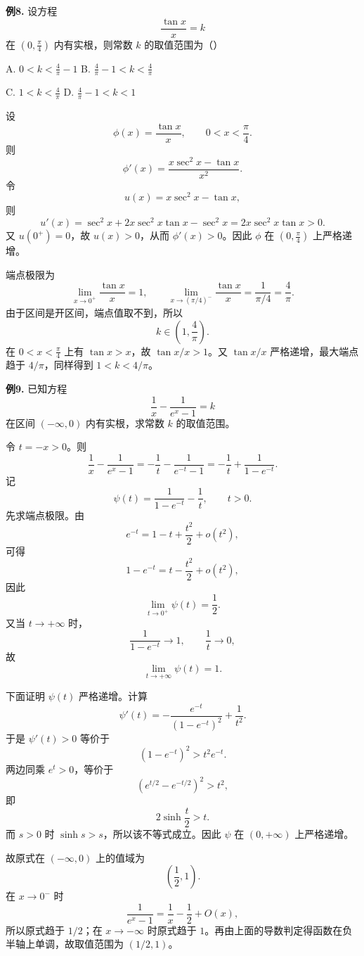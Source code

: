 \begin{problemblock}
\textbf{例8.} 设方程
\[
\frac{\tan x}{x}=k
\]
在 \(\left(0,\frac{\pi}{4}\right)\) 内有实根，则常数 \(k\) 的取值范围为（\quad）

A. \(0<k<\frac4\pi-1\) \qquad
B. \(\frac4\pi-1<k<\frac4\pi\)

C. \(1<k<\frac4\pi\) \qquad
D. \(\frac4\pi-1<k<1\)
\end{problemblock}
\begin{solutionblock}
设
\[
\phi(x)=\frac{\tan x}{x},\qquad 0<x<\frac{\pi}{4}.
\]
则
\[
\phi'(x)=\frac{x\sec^2x-\tan x}{x^2}.
\]
令
\[
u(x)=x\sec^2x-\tan x,
\]
则
\[
u'(x)=\sec^2x+2x\sec^2x\tan x-\sec^2x
=2x\sec^2x\tan x>0.
\]
又 \(u(0^+)=0\)，故 \(u(x)>0\)，从而 \(\phi'(x)>0\)。因此 \(\phi\) 在 \(\left(0,\frac\pi4\right)\) 上严格递增。

端点极限为
\[
\lim_{x\to0^+}\frac{\tan x}{x}=1,
\qquad
\lim_{x\to(\pi/4)^-}\frac{\tan x}{x}=\frac{1}{\pi/4}=\frac4\pi.
\]
由于区间是开区间，端点值取不到，所以
\[
k\in\left(1,\frac4\pi\right).
\]
在 \(0<x<\frac\pi4\) 上有 \(\tan x>x\)，故 \(\tan x/x>1\)。又 \(\tan x/x\) 严格递增，最大端点趋于 \(4/\pi\)，同样得到 \(1<k<4/\pi\)。
\end{solutionblock}

\begin{problemblock}
\textbf{例9.} 已知方程
\[
\frac1x-\frac{1}{e^x-1}=k
\]
在区间 \((-\infty,0)\) 内有实根，求常数 \(k\) 的取值范围。
\end{problemblock}
\begin{solutionblock}
令 \(t=-x>0\)。则
\[
\frac1x-\frac{1}{e^x-1}
=-\frac1t-\frac{1}{e^{-t}-1}
=-\frac1t+\frac{1}{1-e^{-t}}.
\]
记
\[
\psi(t)=\frac{1}{1-e^{-t}}-\frac1t,\qquad t>0.
\]
先求端点极限。由
\[
e^{-t}=1-t+\frac{t^2}{2}+o(t^2),
\]
可得
\[
1-e^{-t}=t-\frac{t^2}{2}+o(t^2),
\]
因此
\[
\lim_{t\to0^+}\psi(t)=\frac12.
\]
又当 \(t\to+\infty\) 时，
\[
\frac{1}{1-e^{-t}}\to1,\qquad \frac1t\to0,
\]
故
\[
\lim_{t\to+\infty}\psi(t)=1.
\]

下面证明 \(\psi(t)\) 严格递增。计算
\[
\psi'(t)=-\frac{e^{-t}}{(1-e^{-t})^2}+\frac1{t^2}.
\]
于是 \(\psi'(t)>0\) 等价于
\[
(1-e^{-t})^2>t^2e^{-t}.
\]
两边同乘 \(e^t>0\)，等价于
\[
(e^{t/2}-e^{-t/2})^2>t^2,
\]
即
\[
2\sinh\frac t2>t.
\]
而 \(s>0\) 时 \(\sinh s>s\)，所以该不等式成立。因此 \(\psi\) 在 \((0,+\infty)\) 上严格递增。

故原式在 \((-\infty,0)\) 上的值域为
\[
\left(\frac12,1\right).
\]
在 \(x\to0^-\) 时
\[
\frac1{e^x-1}=\frac1x-\frac12+O(x),
\]
所以原式趋于 \(1/2\)；在 \(x\to-\infty\) 时原式趋于 \(1\)。再由上面的导数判定得函数在负半轴上单调，故取值范围为 \((1/2,1)\)。
\end{solutionblock}

